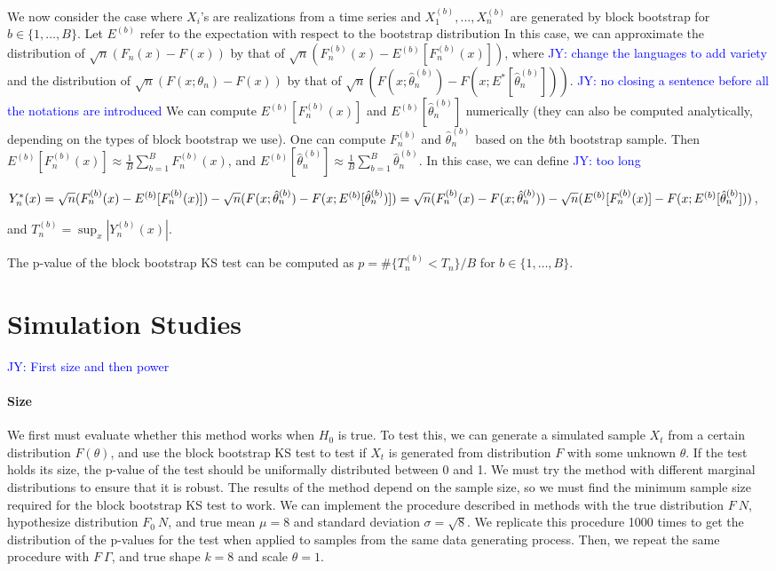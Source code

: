 \documentclass[12pt, letterpaper]{article}
\newcommand{\jy}[1]{\textcolor{blue}{JY: #1}}
\begin{document}
We now consider the case where $X_i$'s are realizations from a time series and
$X^{(b)}_1,...,X^{(b)}_n$ are generated by block bootstrap for 
$b \in \{1, \ldots, B\}$. Let $E^{(b)}$ refer to the expectation with respect to
the bootstrap distribution
In this case, we can 
approximate the distribution of
$\sqrt{n}(F_n(x) - F(x))$
by that of
$\sqrt{n}(F^{(b)}_n(x) - E^{(b)}[F^{(b)}_n(x)])$,
where 
\jy{change the languages to add variety}
and the distribution of $\sqrt{n}(F(x; \theta_n) - F(x))$
by that of $\sqrt{n}(F(x; \hat\theta^{(b)}_n) - F(x; E^*[\hat\theta^{(b)}_n]))$.
\jy{no closing a sentence before all the notations are introduced}
We can compute $E^{(b)}[F^{(b)}_n(x)]$ and 
$E^{(b)}[\hat\theta^{(b)}_n]$ numerically (they can also be computed analytically, 
depending on the types of block bootstrap we use). One can compute 
$F^{(b)}_n$ 
and $\hat\theta^{(b)}_n$ based on
the $b$th bootstrap sample. Then
$E^{(b)}[F^{(b)}_n(x)] \approx \frac{1}{B}\sum_{b = 1}^BF^{(b)}_n(x)$, and
$E^{(b)}[\hat\theta^{(b)}_n] \approx \frac{1}{B}\sum_{b = 1}^B\hat\theta^{(b)}_n$.
In this case, we can define
\jy{too long}


$Y^*_n(x) = \sqrt{n}(F^{(b)}_n(x) - E^{(b)}[F^{(b)}_n(x)]) - 
\sqrt{n}(F(x; \hat\theta^{(b)}_n) - F(x; E^{(b)}[\hat\theta^{(b)}_n)]) \\
= \sqrt{n}(F^{(b)}_n(x) - F(x; \hat\theta^{(b)}_n)) - 
\sqrt{n}(E^{(b)}[F^{(b)}_n(x)] - F(x; E^{(b)}[\hat\theta^{(b)}_n]))$,


and $T^{(b)}_n = \sup_x|Y^{(b)}_n(x)|$.

The p-value of the block bootstrap KS test can be computed 
as $p = \#\{T^{(b)}_n < T_n\} / B$ for 
$b \in \{1, \ldots, B\}$.

\section{Simulation Studies}
\label{sec:simu}

\jy{First size and then power}

\paragraph{Size}
We first must evaluate whether this method works when $H_0$ is true. To
test this, we can
generate a simulated sample $X_t$ from a certain distribution $F(\theta)$,
and use the block bootstrap KS test to test if $X_t$ is generated from 
distribution $F$ with some unknown $\theta$. If the test holds its size, the 
p-value
of the test should be uniformally distributed between 0 and 1. We must try the
method with different marginal distributions to ensure that it is robust.
The results of the method depend on the sample size, so we must find the minimum
sample size required for the block bootstrap KS test to work.
We can implement the procedure described in methods with the true distribution
$F ~ N$, hypothesize distribution $F_0 ~ N$, and true mean $\mu = 8$ and 
standard deviation $\sigma = \sqrt{8}$.
We replicate this procedure 1000 times to get the distribution of the p-values 
for the test when applied to samples from the same data generating process.
Then, we repeat the same procedure with $F ~ \Gamma$, and true shape $k = 8$ and
scale $\theta = 1$.
\end{document}
